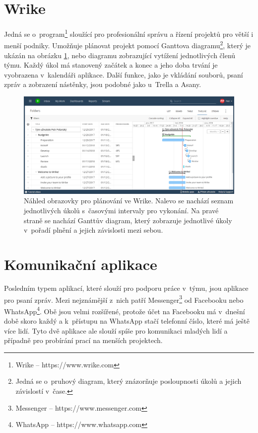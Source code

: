 \section{Wrike}

Jedná se o~program\footnote{Wrike -- https://www.wrike.com} sloužící pro profesionální správu a řízení projektů pro větší i menší podniky. Umožňuje plánovat projekt pomocí Ganttova diagramu\footnote{Jedná se o~pruhový diagram, který znázorňuje posloupnosti úkolů a jejich závislostí v~čase.}, který je ukázán na obrázku \ref{wrike}, nebo diagramu zobrazující vytížení jednotlivých členů týmu. Každý úkol má stanovený začátek a konec a jeho doba trvání je vyobrazena v~kalendáři aplikace. Další funkce, jako je vkládání souborů, psaní zpráv a zobrazení nástěnky, jsou podobné jako u~Trella a Asany. 

\begin{figure}[H]
\centering
\includegraphics[width= 15cm]{obrazky-figures/Wrike_Gantt}
\caption{Náhled obrazovky pro plánování ve Wrike. Nalevo se nachází seznam jednotlivých úkolů s~časovými intervaly pro vykonání. Na pravé straně se nachází Ganttův diagram, který zobrazuje jednotlivé úkoly v~pořadí plnění  a jejich závislosti mezi sebou. }
\label{wrike}
\end{figure}

\section{Komunikační aplikace}

Posledním typem aplikací, které slouží pro podporu práce v~týmu, jsou aplikace pro psaní zpráv. Mezi nejznámější z~nich patří Messenger\footnote{Messenger -- https://www.messenger.com} od Facebooku nebo WhatsApp\footnote{WhatsApp -- https://www.whatsapp.com}. Obě jsou velmi rozšířené, protože účet na Facebooku má v~dnešní době skoro každý a k~přístupu na WhatsApp stačí telefonní číslo, které má ještě více lidí. Tyto dvě aplikace ale slouží spíše pro komunikaci mladých lidí a případně pro probírání prací na menších projektech. 

